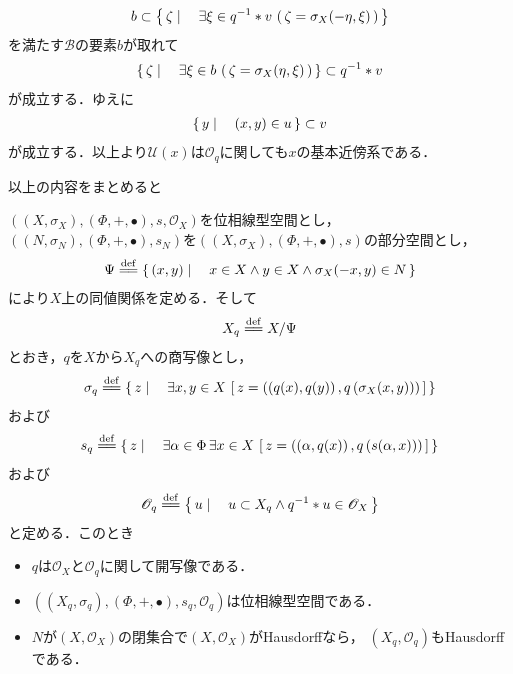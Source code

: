 \begin{sketch}
\begin{description}
				\begin{align}
					b \subset \left\{\, \zeta \mid \quad \exists \xi \in q^{-1} \ast v\, \left(\, \zeta = \sigma_X(-\eta,\xi)\, \right)\, \right\}
				\end{align}
				を満たす$\mathscr{B}$の要素$b$が取れて
				\begin{align}
					\left\{\, \zeta \mid \quad \exists \xi \in b\, \left(\, \zeta = \sigma_X(\eta,\xi)\, \right)\, \right\}
					\subset q^{-1} \ast v
				\end{align}
				が成立する．ゆえに
				\begin{align}
					\left\{\, y \mid \quad (x,y) \in u\, \right\} \subset v
				\end{align}
				が成立する．以上より$\mathscr{U}(x)$は$\mathscr{O}_q$に関しても$x$の基本近傍系である．
				\QED
		\end{description}
	\end{sketch}
	
	以上の内容をまとめると
	\begin{screen}
		\begin{thm}[位相線型空間を部分空間で割ったときの商位相は線型位相である]
			$\left((X,\sigma_X),(\Phi,+,\bullet),s,\mathscr{O}_X\right)$を位相線型空間とし，
			$\left((N,\sigma_N),(\Phi,+,\bullet),s_N\right)$を$\left((X,\sigma_X),(\Phi,+,\bullet),s\right)$の部分空間とし，
			\begin{align}
				\Psi \defeq \Set{(x,y)}{x \in X \wedge y \in X \wedge \sigma_X(-x,y) \in N}
			\end{align}
			により$X$上の同値関係を定める．そして
			\begin{align}
				X_q \defeq X/\Psi
			\end{align}
			とおき，$q$を$X$から$X_q$への商写像とし，
			\begin{align}
				\sigma_q \defeq \Set{z}{\exists x,y \in X\, 
				\left[\, z=\left(\left(q(x),q(y)\right),q\left(\sigma_X(x,y)\right)\right)\, \right]}
			\end{align}
			および
			\begin{align}
				s_q \defeq \Set{z}{\exists \alpha \in \Phi\, \exists x \in X\, 
				\left[\, z=\left(\left(\alpha,q(x)\right),q\left(s(\alpha,x)\right)\right)\, \right]}
			\end{align}
			および
			\begin{align}
				\mathscr{O}_q \defeq \Set{u}{u \subset X_q \wedge q^{-1} \ast u \in \mathscr{O}_X}
			\end{align}
			と定める．このとき
			\begin{itemize}
				\item $q$は$\mathscr{O}_X$と$\mathscr{O}_q$に関して開写像である．
				
				\item $\left(\left(X_q,\sigma_q\right),\left(\Phi,+,\bullet\right),s_q,\mathscr{O}_q\right)$は位相線型空間である．
				
				\item $N$が$(X,\mathscr{O}_X)$の閉集合で$(X,\mathscr{O}_X)$がHausdorffなら，
					$(X_q,\mathscr{O}_q)$もHausdorffである．
			\end{itemize}
		\end{thm}
	\end{screen}